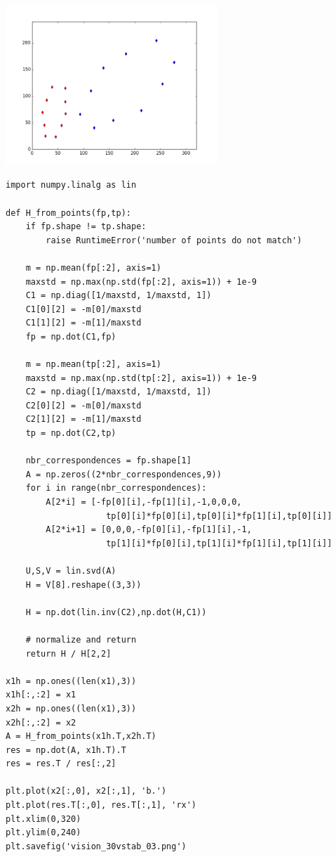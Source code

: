 \documentclass[12pt,fleqn]{article}\usepackage{../../common}
\begin{document}
\includegraphics[height=6cm]{vision_30vstab_02.png}

\begin{verbatim}
import numpy.linalg as lin

def H_from_points(fp,tp):
    if fp.shape != tp.shape:
        raise RuntimeError('number of points do not match')
        
    m = np.mean(fp[:2], axis=1)
    maxstd = np.max(np.std(fp[:2], axis=1)) + 1e-9
    C1 = np.diag([1/maxstd, 1/maxstd, 1]) 
    C1[0][2] = -m[0]/maxstd
    C1[1][2] = -m[1]/maxstd
    fp = np.dot(C1,fp)
    
    m = np.mean(tp[:2], axis=1)
    maxstd = np.max(np.std(tp[:2], axis=1)) + 1e-9
    C2 = np.diag([1/maxstd, 1/maxstd, 1])
    C2[0][2] = -m[0]/maxstd
    C2[1][2] = -m[1]/maxstd
    tp = np.dot(C2,tp)
    
    nbr_correspondences = fp.shape[1]
    A = np.zeros((2*nbr_correspondences,9))
    for i in range(nbr_correspondences):        
        A[2*i] = [-fp[0][i],-fp[1][i],-1,0,0,0,
                    tp[0][i]*fp[0][i],tp[0][i]*fp[1][i],tp[0][i]]
        A[2*i+1] = [0,0,0,-fp[0][i],-fp[1][i],-1,
                    tp[1][i]*fp[0][i],tp[1][i]*fp[1][i],tp[1][i]]
    
    U,S,V = lin.svd(A)
    H = V[8].reshape((3,3))    
    
    H = np.dot(lin.inv(C2),np.dot(H,C1))
    
    # normalize and return
    return H / H[2,2]

x1h = np.ones((len(x1),3))
x1h[:,:2] = x1
x2h = np.ones((len(x1),3))
x2h[:,:2] = x2
A = H_from_points(x1h.T,x2h.T)
res = np.dot(A, x1h.T).T
res = res.T / res[:,2]

plt.plot(x2[:,0], x2[:,1], 'b.')
plt.plot(res.T[:,0], res.T[:,1], 'rx')
plt.xlim(0,320)
plt.ylim(0,240)
plt.savefig('vision_30vstab_03.png')
\end{verbatim}
\end{document}
